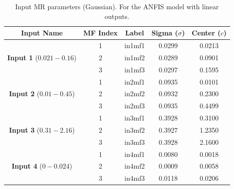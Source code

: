 \documentclass[12pt]{article}
\begin{document}
\begin{table}[H]
\centering
\begin{tabular}{|c|c|c|c|c|}
\hline
\textbf{Input Name} & \textbf{MF Index} & \textbf{Label} & \textbf{Sigma ($\sigma$)} & \textbf{Center ($c$)} \\ \hline
\multirow{3}{*}{\textbf{Input 1} ($0.021 - 0.16$)} 
 & 1 & in1mf1 & 0.0299 & 0.0213 \\ \cline{2-5} 
 & 2 & in1mf2 & 0.0289 & 0.0901 \\ \cline{2-5} 
 & 3 & in1mf3 & 0.0297 & 0.1595 \\ \hline
\hline
\multirow{3}{*}{\textbf{Input 2} ($0.01 - 0.45$)} 
 & 1 & in2mf1 & 0.0935 & 0.0101 \\ \cline{2-5} 
 & 2 & in2mf2 & 0.0932 & 0.2300 \\ \cline{2-5} 
 & 3 & in2mf3 & 0.0935 & 0.4499 \\ \hline
\hline
\multirow{3}{*}{\textbf{Input 3} ($0.31 - 2.16$)} 
 & 1 & in3mf1 & 0.3928 & 0.3100 \\ \cline{2-5} 
 & 2 & in3mf2 & 0.3927 & 1.2350 \\ \cline{2-5} 
 & 3 & in3mf3 & 0.3928 & 2.1600 \\ \hline
\hline
\multirow{3}{*}{\textbf{Input 4} ($0 - 0.024$)} 
 & 1 & in4mf1 & 0.0080 & 0.0018 \\ \cline{2-5} 
 & 2 & in4mf2 & 0.0009 & 0.0058 \\ \cline{2-5} 
 & 3 & in4mf3 & 0.0118 & 0.0206 \\ \hline
\end{tabular}
\caption{Input MR parameters (Gaussian). 
For the ANFIS model with linear outputs.}
\label{tab:inputlinearBa}
\end{table}
\end{document}
